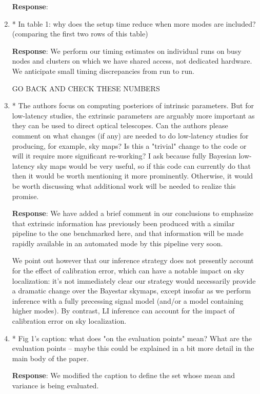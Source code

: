 \documentclass[onecolumn]{revtex4}
\newcommand\editremark[1]{{\color{red} #1}}
\begin{document}
\begin{enumerate}
\noindent \textbf{Response}:

\item * In table 1: why does the setup time reduce when more modes are
included? (comparing the first two rows of this table)

\noindent \textbf{Response}:  We perform our timing estimates on individual runs on busy nodes and clusters on which we
have shared access, not
dedicated hardware.  We anticipate small timing discrepancies from run to run.

\editremark{GO BACK AND CHECK THESE NUMBERS}

\item * The authors focus on computing posteriors of intrinsic parameters.
But for low-latency studies, the extrinsic parameters are arguably
more important as they can be used to direct optical telescopes. Can
the authors please comment on what changes (if any) are needed to do
low-latency studies for producing, for example, sky maps? Is this a
"trivial" change to the code or will it require more significant
re-working? I ask because fully Bayesian low-latency sky maps would be
very useful, so if this code can currently do that then it would be
worth mentioning it more prominently. Otherwise, it would be worth
discussing what additional work will be needed to realize this
promise.

\noindent \textbf{Response}:  We have added a brief comment in our conclusions to emphasize that extrinsic information
has previously been produced with a similar pipeline to the one benchmarked  here,  and that information will be
made rapidly available in an automated mode by this pipeline very soon.

We point out however that our inference strategy does not presently account for the effect of calibration error, which can have a
notable impact on sky localization: it's not immediately clear our strategy would necessarily provide a dramatic change
over the Bayestar skymaps, except insofar as we perform inference with a fully precessing signal model (and/or a model
containing higher modes).     By contrast, LI inference can account for the impact of calibration error on sky localization.

\item * Fig 1's caption: what does "on the evaluation points" mean? What are
the evaluation points -- maybe this could be explained in a bit more
detail in the main body of the paper.

\noindent \textbf{Response}: We modified the caption to define the set whose mean and variance is being evaluated. 


\end{enumerate}
\end{document}
